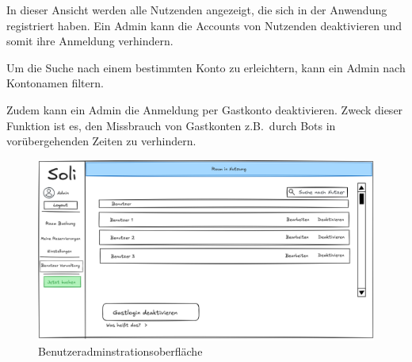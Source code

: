 In dieser Ansicht werden alle Nutzenden angezeigt, die sich in der Anwendung registriert haben.
Ein Admin kann die Accounts von Nutzenden deaktivieren und somit ihre Anmeldung verhindern.

Um die Suche nach einem bestimmten Konto zu erleichtern, kann ein Admin nach Kontonamen filtern.

Zudem kann ein Admin die Anmeldung per Gastkonto deaktivieren.
Zweck dieser Funktion ist es, den Missbrauch von Gastkonten z.B.\ durch Bots in vorübergehenden Zeiten zu verhindern.

\begin{figure}[ht]
    \centering
    \includegraphics[width=\textwidth]{figures/ui/useradminui}
    \caption{Benutzeradminstrationsoberfläche}
    \label{fig:adminuser}
\end{figure}

